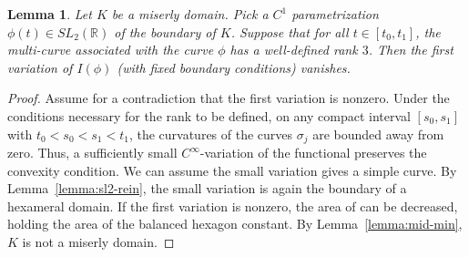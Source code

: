 \documentclass[11pt]{amsart}
\newtheorem{lemma}[equation]{Lemma}
\newcommand{\ring}[1]{\mathbb{#1}}
\begin{document}
\begin{lemma} Let $K$ be a miserly domain.  Pick a $C^1$
  parametrization $\phi(t)\in SL_2(\ring{R})$ of the boundary of $K$.
  Suppose that for all $t\in[t_0,t_1]$, the multi-curve associated
  with the curve $\phi$ has a well-defined rank $3$.  Then the first
  variation of $I(\phi)$ (with fixed boundary conditions) vanishes.
\end{lemma}

\begin{proof} Assume for a contradiction that the first variation is
  nonzero. Under the conditions necessary for the rank to be defined,
  on any compact interval $[s_0,s_1]$ with $t_0 < s_0 < s_1 < t_1$,
  the curvatures of the curves $\sigma_j$ are bounded away from zero.
  Thus, a sufficiently small $C^\infty$-variation of the functional
  preserves the convexity condition.  We can assume the small
  variation gives a simple curve.  By Lemma~\ref{lemma:sl2-rein}, the
  small variation is again the boundary of a hexameral domain.  If the
  first variation is nonzero, the area of can be decreased, holding
  the area of the balanced hexagon constant.  By
  Lemma~\ref{lemma:mid-min}, $K$ is not a miserly domain.
\end{proof}
\end{document}

